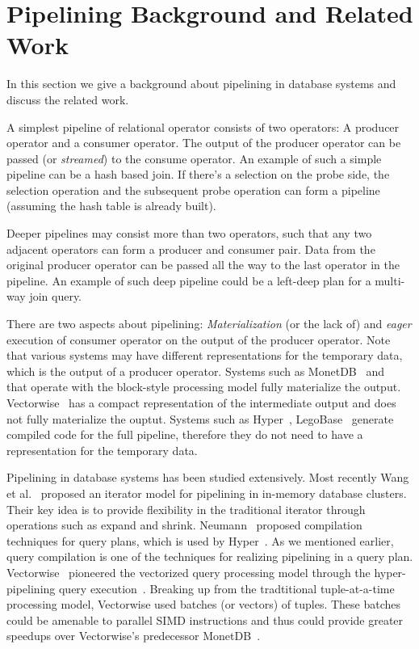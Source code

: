 \section{Pipelining Background and Related Work}\label{sec:pipe-background}
In this section we give a background about pipelining in database systems and discuss the related work. 

A simplest pipeline of relational operator consists of two operators: A producer operator and a consumer operator. 
The output of the producer operator can be passed (or \textit{streamed}) to the consume operator. 
An example of such a simple pipeline can be a hash based join. 
If there's a selection on the probe side, the selection operation and the subsequent probe operation can form a pipeline (assuming the hash table is already built).

Deeper pipelines may consist more than two operators, such that any two adjacent operators can form a producer and consumer pair.
Data from the original producer operator can be passed all the way to the last operator in the pipeline. 
An example of such deep pipeline could be a left-deep plan for a multi-way join query.

%
There are two aspects about pipelining: \textit{Materialization} (or the lack of) and \textit{eager} execution of consumer operator on the output of the producer operator. 
Note that various systems may have different representations for the temporary data, which is the output of a producer operator. 
Systems such as MonetDB~\cite{monetdb} and \sys{}~\cite{quickstep-system} that operate with the block-style processing model fully materialize the output. 
Vectorwise~\cite{vectorwise} has a compact representation of the intermediate output and does not fully materialize the ouptut.
Systems such as Hyper~\cite{hyper}, LegoBase~\cite{legobase} generate compiled code for the full pipeline, therefore they do not need to have a representation for the temporary data.

Pipelining in database systems has been studied extensively. 
Most recently Wang et al.~\cite{wang2016elastic} proposed an iterator model for pipelining in in-memory database clusters.
Their key idea is to provide flexibility in the traditional iterator through operations such as expand and shrink.
Neumann~\cite{DBLP:journals/pvldb/Neumann11} proposed compilation techniques for query plans, which is used by Hyper~\cite{hyper, morsel}. 
As we mentioned earlier, query compilation is one of the techniques for realizing pipelining in a query plan. 
Vectorwise~\cite{vectorwise} pioneered the vectorized query processing model through the hyper-pipelining query execution~\cite{hyper-pipelining}.
Breaking up from the tradtitional tuple-at-a-time processing model, Vectorwise used batches (or vectors) of tuples. 
These batches could be amenable to parallel SIMD instructions and thus could provide greater speedups over Vectorwise's predecessor MonetDB~\cite{monetdb}.

